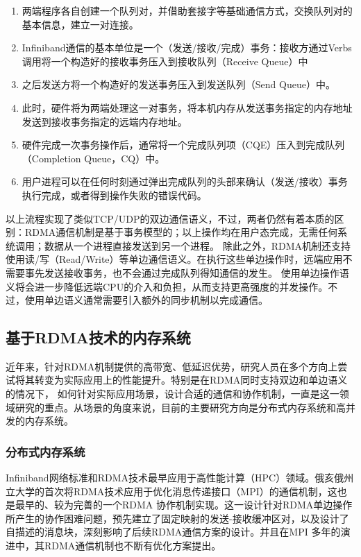 \begin{enumerate}
	\item 两端程序各自创建一个队列对，并借助套接字等基础通信方式，交换队列对的基本信息，建立一对连接。
	\item Infiniband通信的基本单位是一个（发送/接收/完成）事务：接收方通过Verbs调用将一个构造好的接收事务压入到接收队列（Receive Queue）中
	\item 之后发送方将一个构造好的发送事务压入到发送队列（Send Queue）中。
	\item 此时，硬件将为两端处理这一对事务，将本机内存从发送事务指定的内存地址发送到接收事务指定的远端内存地址。
	\item 硬件完成一次事务操作后，通常将一个完成队列项（CQE）压入到完成队列（Completion Queue，CQ）中。
	\item 用户进程可以在任何时刻通过弹出完成队列的头部来确认（发送/接收）事务执行完成，或者得到操作失败的错误代码。
\end{enumerate}

以上流程实现了类似TCP/UDP的双边通信语义，不过，两者仍然有着本质的区别：RDMA通信机制是基于事务模型的；以上操作均在用户态完成，无需任何系统调用；数据从一个进程直接发送到另一个进程。
除此之外，RDMA机制还支持使用读/写（Read/Write）等单边通信语义。在执行这些单边操作时，远端应用不需要事先发送接收事务，也不会通过完成队列得知通信的发生。
使用单边操作语义将会进一步降低远端CPU的介入和负担，从而支持更高强度的并发操作。不过，使用单边语义通常需要引入额外的同步机制以完成通信。

\subsection{基于RDMA技术的内存系统}

近年来，针对RDMA机制提供的高带宽、低延迟优势，研究人员在多个方向上尝试将其转变为实际应用上的性能提升。特别是在RDMA同时支持双边和单边语义的情况下，
如何针对实际应用场景，设计合适的通信和协作机制，一直是这一领域研究的重点。从场景的角度来说，目前的主要研究方向是分布式内存系统和高并发的内存系统。

\subsubsection{分布式内存系统}

Infiniband网络标准和RDMA技术最早应用于高性能计算（HPC）领域。俄亥俄州立大学的\cite{}首次将RDMA技术应用于优化消息传递接口（MPI）的通信机制，这也是最早的、较为完善的一个RDMA
协作机制实现。这一设计针对RDMA单边操作所产生的协作困难问题，预先建立了固定映射的发送-接收缓冲区对，以及设计了自描述的消息块，深刻影响了后续RDMA通信方案的设计。并且在MPI
多年的演进中，其RDMA通信机制也不断有优化方案提出。

